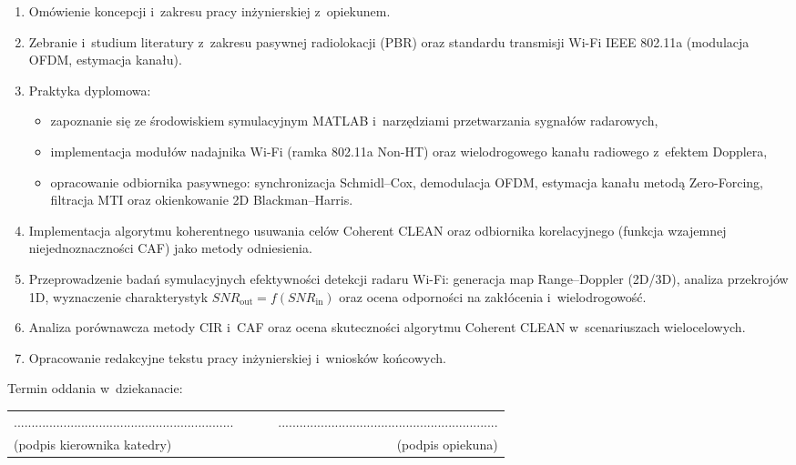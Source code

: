 \begin{enumerate}
    \item Omówienie koncepcji i~zakresu pracy inżynierskiej z~opiekunem.
    \item Zebranie i~studium literatury z~zakresu pasywnej radiolokacji (PBR) oraz standardu transmisji Wi-Fi IEEE 802.11a (modulacja OFDM, estymacja kanału).
    \item Praktyka dyplomowa:
          \begin{itemize}
              \item zapoznanie się ze środowiskiem symulacyjnym MATLAB i~narzędziami przetwarzania sygnałów radarowych,
              \item implementacja modułów nadajnika Wi-Fi (ramka 802.11a Non-HT) oraz wielodrogowego kanału radiowego z~efektem Dopplera,
              \item opracowanie odbiornika pasywnego: synchronizacja Schmidl--Cox, demodulacja OFDM, estymacja kanału metodą Zero-Forcing, filtracja MTI oraz okienkowanie 2D Blackman--Harris.
          \end{itemize}
    \item Implementacja algorytmu koherentnego usuwania celów Coherent CLEAN oraz odbiornika korelacyjnego (funkcja wzajemnej niejednoznaczności CAF) jako metody odniesienia.
    \item Przeprowadzenie badań symulacyjnych efektywności detekcji radaru Wi-Fi: generacja map Range--Doppler (2D/3D), analiza przekrojów 1D, wyznaczenie charakterystyk $SNR_{\mathrm{out}} = f(SNR_{\mathrm{in}})$ oraz ocena odporności na zakłócenia i~wielodrogowość.
    \item Analiza porównawcza metody CIR i~CAF oraz ocena skuteczności algorytmu Coherent CLEAN w~scenariuszach wielocelowych.
    \item Opracowanie redakcyjne tekstu pracy inżynierskiej i~wniosków końcowych.
\end{enumerate}

\noindent
Termin oddania w~dziekanacie: \\[1cm]

\begin{center}
    \begin{tabular}{lcr}
        .............................................................. & ~~~ &
        ..............................................................                           \\
        (podpis kierownika katedry)                                    &     & (podpis opiekuna) \\
    \end{tabular}
\end{center}